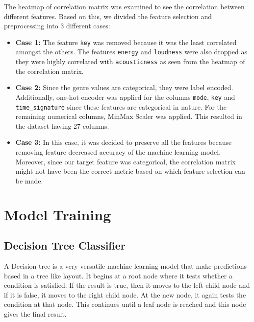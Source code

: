 \documentclass[conference]{IEEEtran}
\begin{document}
The heatmap of correlation matrix was examined to see the correlation between different features. Based on this, we divided the feature selection and preprocessing into 3 different cases:

\begin{itemize}
\item \textbf{\textbf{Case 1:}} The feature \texttt{key} was removed because it was the least correlated amongst the others. The features \texttt{energy} and \texttt{loudness} were also dropped as they were highly correlated with \texttt{acousticness} as seen from the heatmap of the correlation matrix.

\item \textbf{\textbf{Case 2:}} Since the  genre values are categorical, they were label encoded. Additionally, one-hot encoder was applied for the columns \texttt{mode}, \texttt{key} and \texttt{time\_signature} since these features are categorical in nature.  For the remaining numerical columns, MinMax Scaler was applied. This resulted in the dataset having 27 columns.

\item \textbf{\textbf{Case 3:}} In this case, it was decided to preserve all the features because removing feature decreased accuracy of the machine learning model. Moreover, since our target feature was categorical, the correlation matrix might not have been the correct metric based on which feature selection can be made.
\end{itemize}


\section{Model Training}
\label{sec:org49ca924}

\subsection{Decision Tree Classifier}
\label{sec:org581eced}

A Decision tree \cite{geron2019hands} is a  very versatile machine learning model that make predictions based in a tree like layout. It begins at a root node where it tests whether a condition is satisfied. If the result is true, then it moves to the left child node and if it is false, it moves to the right child node. At the new node, it again tests the condition at that node. This continues until a leaf node is reached and this node gives the final result.
\end{document}
